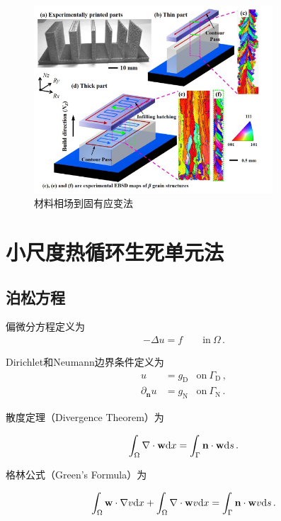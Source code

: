 \begin{figure}[!htbp]
  \centering
  \includegraphics[height=7cm]{fig/4/4.png}
  \caption{材料相场到固有应变法}
  \label{fig:4.0.0.4}
\end{figure}

\section{小尺度热循环生死单元法}
\subsection{泊松方程}

偏微分方程定义为
\begin{align}\label{eq:4.1.1:1}
  -\Delta u = f \qquad \mathrm{in}\ \Omega\,.
\end{align}

Dirichlet和Neumann边界条件定义为
\begin{subequations}
  \begin{align}\label{eq:4.1.1:2}
    u &= g_{\mathrm D} &\mathrm{on}\ \Gamma_{\mathrm D}\,, \\
    \partial_{\mathbf n}u & = g_{\mathrm N} &\mathrm{on}\ \Gamma_{\mathrm N}\,.
  \end{align}
\end{subequations}

散度定理（Divergence Theorem）为

\begin{align*}
  \int_{\Omega}\nabla \cdot \mathbf w \mathrm{d} x = \int_{\Gamma}\mathbf n \cdot \mathbf w \mathrm{d} s\,.
\end{align*}

格林公式（Green's Formula）为

\begin{align*}
  \int_{\Omega}\mathbf w \cdot \nabla v  \mathrm{d} x  + \int_{\Omega}\nabla\cdot\mathbf w  v  \mathrm{d} x = \int_{\Gamma}\mathbf n \cdot \mathbf w v\mathrm{d} s \,.
\end{align*}

